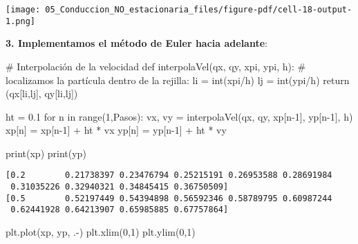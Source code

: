 \documentclass[
  letterpaper,
  DIV=11,
  numbers=noendperiod]{scrreprt}
\newenvironment{Shaded}{\begin{snugshade}}{\end{snugshade}}
\newcommand{\BuiltInTok}[1]{\textcolor[rgb]{0.00,0.23,0.31}{#1}}
\newcommand{\CommentTok}[1]{\textcolor[rgb]{0.37,0.37,0.37}{#1}}
\newcommand{\ControlFlowTok}[1]{\textcolor[rgb]{0.00,0.23,0.31}{#1}}
\newcommand{\DecValTok}[1]{\textcolor[rgb]{0.68,0.00,0.00}{#1}}
\newcommand{\FloatTok}[1]{\textcolor[rgb]{0.68,0.00,0.00}{#1}}
\newcommand{\KeywordTok}[1]{\textcolor[rgb]{0.00,0.23,0.31}{#1}}
\newcommand{\NormalTok}[1]{\textcolor[rgb]{0.00,0.23,0.31}{#1}}
\newcommand{\OperatorTok}[1]{\textcolor[rgb]{0.37,0.37,0.37}{#1}}
\newcommand{\StringTok}[1]{\textcolor[rgb]{0.13,0.47,0.30}{#1}}
\begin{document}
\texttt{[image: 05\_Conduccion\_NO\_estacionaria\_files/figure-pdf/cell-18-output-1.png]}

\textbf{3. Implementamos el método de Euler hacia adelante}:

\begin{Shaded}
\begin{Highlighting}[]
\CommentTok{\# Interpolación de la velocidad}
\KeywordTok{def}\NormalTok{ interpolaVel(qx, qy, xpi, ypi, h):}
    \CommentTok{\# localizamos la partícula dentro de la rejilla:}
\NormalTok{    li }\OperatorTok{=} \BuiltInTok{int}\NormalTok{(xpi}\OperatorTok{/}\NormalTok{h)}
\NormalTok{    lj }\OperatorTok{=} \BuiltInTok{int}\NormalTok{(ypi}\OperatorTok{/}\NormalTok{h)}
    \ControlFlowTok{return}\NormalTok{ (qx[li,lj], qy[li,lj])}
\end{Highlighting}
\end{Shaded}

\begin{Shaded}
\begin{Highlighting}[]
\NormalTok{ht }\OperatorTok{=} \FloatTok{0.1}
\ControlFlowTok{for}\NormalTok{ n }\KeywordTok{in} \BuiltInTok{range}\NormalTok{(}\DecValTok{1}\NormalTok{,Pasos):}
\NormalTok{    vx, vy }\OperatorTok{=}\NormalTok{ interpolaVel(qx, qy, xp[n}\OperatorTok{{-}}\DecValTok{1}\NormalTok{], yp[n}\OperatorTok{{-}}\DecValTok{1}\NormalTok{], h)}
\NormalTok{    xp[n] }\OperatorTok{=}\NormalTok{ xp[n}\OperatorTok{{-}}\DecValTok{1}\NormalTok{] }\OperatorTok{+}\NormalTok{ ht }\OperatorTok{*}\NormalTok{ vx}
\NormalTok{    yp[n] }\OperatorTok{=}\NormalTok{ yp[n}\OperatorTok{{-}}\DecValTok{1}\NormalTok{] }\OperatorTok{+}\NormalTok{ ht }\OperatorTok{*}\NormalTok{ vy}
\end{Highlighting}
\end{Shaded}

\begin{Shaded}
\begin{Highlighting}[]
\BuiltInTok{print}\NormalTok{(xp)}
\BuiltInTok{print}\NormalTok{(yp)}
\end{Highlighting}
\end{Shaded}

\begin{verbatim}
[0.2        0.21738397 0.23476794 0.25215191 0.26953588 0.28691984
 0.31035226 0.32940321 0.34845415 0.36750509]
[0.5        0.52197449 0.54394898 0.56592346 0.58789795 0.60987244
 0.62441928 0.64213907 0.65985885 0.67757864]
\end{verbatim}

\begin{Shaded}
\begin{Highlighting}[]
\NormalTok{plt.plot(xp, yp, }\StringTok{\textquotesingle{}.{-}\textquotesingle{}}\NormalTok{)}
\NormalTok{plt.xlim(}\DecValTok{0}\NormalTok{,}\DecValTok{1}\NormalTok{)}
\NormalTok{plt.ylim(}\DecValTok{0}\NormalTok{,}\DecValTok{1}\NormalTok{)}
\end{Highlighting}
\end{Shaded}
\end{document}
